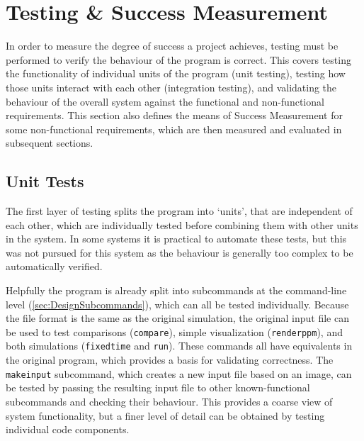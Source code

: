 \chapter{Testing \& Success Measurement}\label{sec:Testing}
In order to measure the degree of success a project achieves, testing must be performed to verify the behaviour of the program is correct.
This covers testing the functionality of individual units of the program (unit testing), testing how those units interact with each other (integration testing), and validating the behaviour of the overall system against the functional and non-functional requirements.
This section also defines the means of Success Measurement for some non-functional requirements, which are then measured and evaluated in subsequent sections.%

\section{Unit Tests}
The first layer of testing splits the program into `units', that are independent of each other, which are individually tested before combining them with other units in the system.
In some systems it is practical to automate these tests, but this was not pursued for this system as the behaviour is generally too complex to be automatically verified.

Helpfully the program is already split into subcommands at the command-line level (\cref{sec:DesignSubcommands}), which can all be tested individually.
Because the file format is the same as the original simulation, the original input file can be used to test comparisons (\texttt{compare}), simple visualization (\texttt{renderppm}), and both simulations (\texttt{fixedtime} and \texttt{run}).
These commands all have equivalents in the original program, which provides a basis for validating correctness.
The \texttt{makeinput} subcommand, which creates a new input file based on an image, can be tested by passing the resulting input file to other known-functional subcommands and checking their behaviour.
This provides a coarse view of system functionality, but a finer level of detail can be obtained by testing individual code components.

